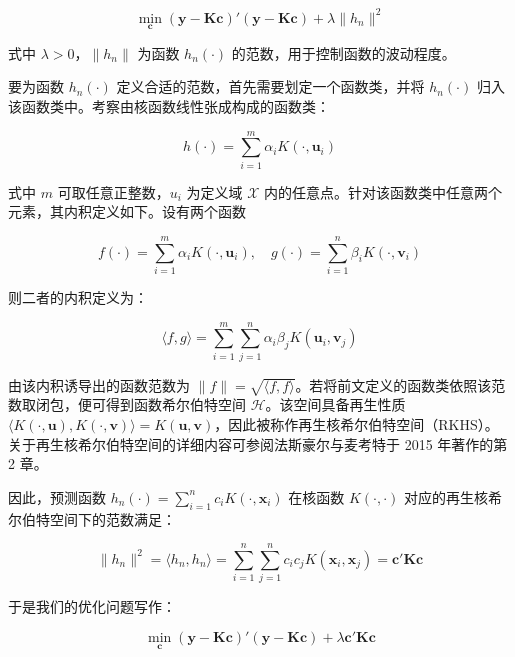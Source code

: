 \documentclass{ctexart}
\begin{document}
\begin{equation*}
\min_{\boldsymbol{c}}(\boldsymbol{y}-\boldsymbol{K}\boldsymbol{c})'(\boldsymbol{y}-\boldsymbol{K}\boldsymbol{c})+\lambda\|h_n\|^2
\end{equation*}

式中 $\lambda > 0$，$\|h_n\|$ 为函数 $h_n(\cdot)$ 的范数，用于控制函数的波动程度。

要为函数 $h_n(\cdot)$ 定义合适的范数，首先需要划定一个函数类，并将 $h_n(\cdot)$ 归入该函数类中。考察由核函数线性张成构成的函数类：

\begin{equation*}
h(\cdot)=\sum_{i=1}^m\alpha_i K(\cdot,\boldsymbol{u}_i)
\end{equation*}

式中 $m$ 可取任意正整数，$u_i$ 为定义域 $\mathcal{X}$ 内的任意点。针对该函数类中任意两个元素，其内积定义如下。设有两个函数

\begin{equation*}
f(\cdot)=\sum_{i=1}^m\alpha_i K(\cdot,\boldsymbol{u}_i),\quad g(\cdot)=\sum_{i=1}^n\beta_i K(\cdot,\boldsymbol{v}_i)
\end{equation*}

则二者的内积定义为：

\begin{equation*}
\langle f,g\rangle=\sum_{i=1}^m\sum_{j=1}^n\alpha_i\beta_j K(\boldsymbol{u}_i,\boldsymbol{v}_j)
\end{equation*}

由该内积诱导出的函数范数为 $\|f\|=\sqrt{\langle f,f\rangle}$。若将前文定义的函数类依照该范数取闭包，便可得到函数希尔伯特空间 $\mathcal{H}$。该空间具备再生性质 $\langle K(\cdot,\boldsymbol{u}),K(\cdot,\boldsymbol{v})\rangle=K(\boldsymbol{u},\boldsymbol{v})$，因此被称作再生核希尔伯特空间（RKHS）。关于再生核希尔伯特空间的详细内容可参阅法斯豪尔与麦考特于 2015 年著作的第 2 章。

因此，预测函数 $h_n(\cdot)=\sum_{i=1}^n c_iK(\cdot,\boldsymbol{x}_i)$ 在核函数 $K(\cdot,\cdot)$ 对应的再生核希尔伯特空间下的范数满足：

\begin{equation*}
\|h_n\|^2=\langle h_n,h_n\rangle=\sum_{i=1}^n\sum_{j=1}^n c_ic_jK(\boldsymbol{x}_i,\boldsymbol{x}_j)=\boldsymbol{c}'\boldsymbol{K}\boldsymbol{c}
\end{equation*}

于是我们的优化问题写作：

\begin{equation*}
\min_{\boldsymbol{c}}(\boldsymbol{y}-\boldsymbol{K}\boldsymbol{c})'(\boldsymbol{y}-\boldsymbol{K}\boldsymbol{c})+\lambda\boldsymbol{c}'\boldsymbol{K}\boldsymbol{c}
\tag{2.41}
\end{equation*}
\end{document}
